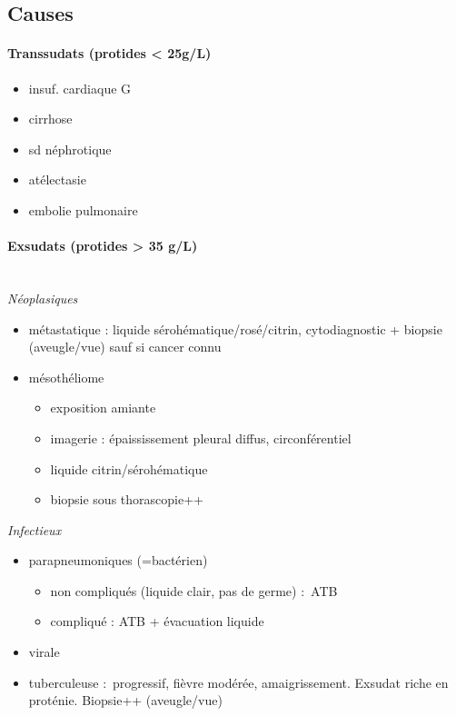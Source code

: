 \documentclass{article}
\begin{document}
\subsection{Causes}
\paragraph{Transsudats (protides < 25g/L)}
\begin{itemize}
\item insuf. cardiaque G
\item cirrhose
\item sd néphrotique
\item atélectasie
\item embolie pulmonaire
\end{itemize}

\paragraph{Exsudats (protides > 35 g/L)}\mbox{}\\
\textit{Néoplasiques} 
\begin{itemize}
\item métastatique : liquide sérohématique/rosé/citrin, cytodiagnostic +
  biopsie (aveugle/vue) sauf si cancer connu
\item mésothéliome 
  \begin{itemize}
  \item exposition amiante
  \item imagerie : épaississement pleural diffus, circonférentiel
  \item liquide citrin/sérohématique
  \item biopsie sous thorascopie++
  \end{itemize}
\end{itemize}

\textit{Infectieux} 
\begin{itemize}
\item parapneumoniques (=bactérien) 
  \begin{itemize}
  \item non compliqués (liquide clair, pas de germe) : ATB
  \item compliqué : ATB + évacuation liquide
  \end{itemize}
\item virale
\item tuberculeuse : progressif, fièvre modérée, amaigrissement. Exsudat riche
  en proténie. Biopsie++ (aveugle/vue)
\end{itemize}
\end{document}
